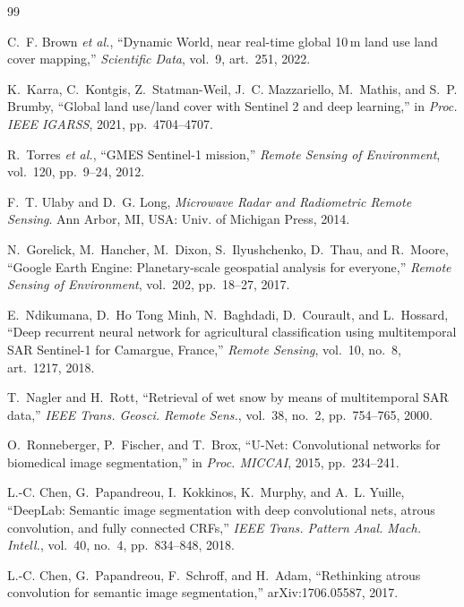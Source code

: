 \documentclass[12pt,conference]{IEEEtran}
\begin{document}

\begin{thebibliography}{99}

C.~F. Brown \emph{et al.}, ``Dynamic World, near real-time global 10\,m land use land cover mapping,''
\emph{Scientific Data}, vol.~9, art.~251, 2022.

K.~Karra, C.~Kontgis, Z.~Statman-Weil, J.~C. Mazzariello, M.~Mathis, and S.~P. Brumby, ``Global land use/land cover
with Sentinel 2 and deep learning,'' in \emph{Proc. IEEE IGARSS}, 2021, pp.~4704--4707.

R.~Torres \emph{et al.}, ``GMES Sentinel-1 mission,'' \emph{Remote Sensing of Environment}, vol.~120, pp.~9--24, 2012.

F.~T. Ulaby and D.~G. Long, \emph{Microwave Radar and Radiometric Remote Sensing}. Ann Arbor, MI, USA:
Univ. of Michigan Press, 2014.

N.~Gorelick, M.~Hancher, M.~Dixon, S.~Ilyushchenko, D.~Thau, and R.~Moore, ``Google Earth Engine: Planetary-scale
geospatial analysis for everyone,'' \emph{Remote Sensing of Environment}, vol.~202, pp.~18--27, 2017.

E.~Ndikumana, D.~Ho Tong Minh, N.~Baghdadi, D.~Courault, and L.~Hossard, ``Deep recurrent neural network for
agricultural classification using multitemporal SAR Sentinel-1 for Camargue, France,'' \emph{Remote Sensing}, vol.~10,
no.~8, art.~1217, 2018.

T.~Nagler and H.~Rott, ``Retrieval of wet snow by means of multitemporal SAR data,'' \emph{IEEE Trans. Geosci. Remote
Sens.}, vol.~38, no.~2, pp.~754--765, 2000.

O.~Ronneberger, P.~Fischer, and T.~Brox, ``U-Net: Convolutional networks for biomedical image segmentation,'' in
\emph{Proc. MICCAI}, 2015, pp.~234--241.

L.-C. Chen, G.~Papandreou, I.~Kokkinos, K.~Murphy, and A.~L. Yuille, ``DeepLab: Semantic image segmentation with deep
convolutional nets, atrous convolution, and fully connected CRFs,'' \emph{IEEE Trans. Pattern Anal. Mach. Intell.},
vol.~40, no.~4, pp.~834--848, 2018.

L.-C. Chen, G.~Papandreou, F.~Schroff, and H.~Adam, ``Rethinking atrous convolution for semantic image
segmentation,'' arXiv:1706.05587, 2017.


\end{thebibliography}
\end{document}
